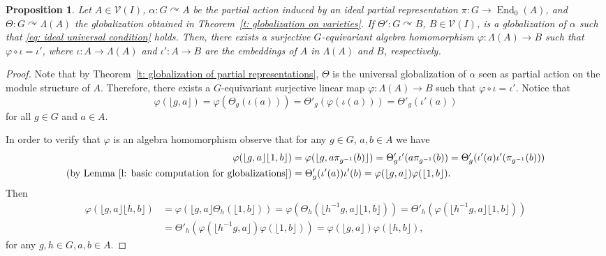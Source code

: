 \documentclass[11pt]{amsart}
\numberwithin{equation}{section}
\newtheorem{proposition}[theorem]{Proposition}
\theoremstyle{definition}
\theoremstyle{remark}
\begin{document}
\begin{proposition}
    Let  \(A\in \mathcal{V}(I)\), \(\alpha: G \curvearrowright A \) be the partial action induced by  an ideal partial representation \(\pi: G\to \operatorname{End}_0(A)\), and \(\Theta: G \curvearrowright \Lambda(A) \)  the globalization obtained in Theorem~\ref{t: globalization on varieties}.
    If \(\Theta': G \curvearrowright B \), \(B\in \mathcal{V}(I)\), is a globalization of \(\alpha\) such that \eqref{eq: ideal universal condition} holds. Then, there exists a surjective  $G$-equivariant algebra homomorphism \(\varphi: \Lambda(A) \to B \) such that \(\varphi \circ \iota = \iota'\), where \(\iota: A \to \Lambda(A) \) and \(\iota': A \to B \) are the embeddings of \(A\) in \(\Lambda(A) \) and \(B\), respectively.
\end{proposition}
\begin{proof}
    Note that  by Theorem~\ref{t: globalization of partial representations}, \(\Theta\) is the universal globalization of \(\alpha\) seen as partial action on the module structure of \(A\).
     Therefore, there exists   a $G$-equivariant surjective linear map \(\varphi: \Lambda(A) \to B \) such that \(\varphi \circ \iota = \iota'\).  Notice that
    \[
        \varphi(\lfloor g, a \rfloor) = \varphi(\Theta_g(\iota(a))) = \Theta'_g(\varphi(\iota(a)))  = \Theta'_g(\iota'(a))
    \] for all $g\in G$ and $a\in A.$
    
      In order to verify that \(\varphi\) is an algebra homomorphism
    observe that for any \(g \in G\), \(a, b \in A\) we have
    \begin{align*}
        \varphi(\lfloor g, a \rfloor \lfloor 1, b \rfloor)
        &= \varphi( \lfloor g, a \pi_{g^{-1}}(b) \rfloor ) 
        =  \Theta_g' \iota'(a \pi_{g^{-1}}(b))
        =  \Theta_g' (\iota'(a) \iota'(\pi_{g^{-1}}(b) ) ) \\
        (\text{by Lemma~\ref{l: basic computation for globalizations}})
        &= \Theta_g' (\iota'(a)) \iota'(b) 
        = \varphi(\lfloor g, a \rfloor)  \varphi(\lfloor 1, b \rfloor). 
    \end{align*}  Then
    \begin{align*} 
     \varphi(\lfloor g, a \rfloor \lfloor h, b \rfloor)
        &= \varphi(\lfloor g, a \rfloor \Theta_h( \lfloor 1, b \rfloor))
         = \varphi(\Theta_h(\lfloor h^{-1}g, a \rfloor  \lfloor 1, b \rfloor))
         = \Theta '_h(\varphi(\lfloor h^{-1}g, a \rfloor  \lfloor 1, b \rfloor))\\
         &= \Theta '_h(\varphi(\lfloor h^{-1}g, a \rfloor ) \varphi(\lfloor 1, b \rfloor))
         = \varphi(\lfloor g, a \rfloor) \varphi( \lfloor h, b \rfloor),
    \end{align*} for any  $g,h\in G, a,b\in A.$
    
\end{proof}
\end{document}
